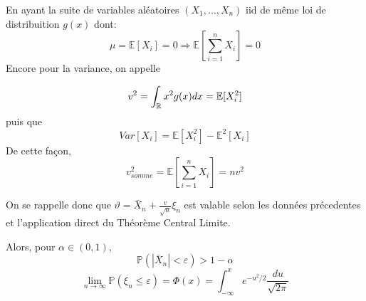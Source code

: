 \documentclass{article}
\newcommand{\mean}{\mathbb{E}}
\begin{document}
En ayant la suite de variables aléatoires $\displaystyle (X_1,...,X_n) $ iid de même loi de distribuition $\displaystyle g(x)$ dont:
$$\mu = \mean[X_i] = 0 \Rightarrow \mean[\sum_{i=1}^n X_i ] = 0 $$
Encore pour la variance, on appelle

$$\displaystyle v^2 = \int_{\cal \mathbb{R}} x^2g(x)dx = \mean[X_i^2]$$
puis que
$$\displaystyle Var[X_i] = \mean[X_i^2]-\mean^2[X_i] $$
De cette façon,
$$v_{somme}^2=\mean[\sum_{i=1}^n X_i ]= nv^2$$


On se rappelle donc que $\displaystyle\vartheta = \bar X_n + \frac{v}{\sqrt{n}}\xi_n$ est valable selon les données précedentes et l'application direct du Théorème Central Limite.

Alors, pour $\displaystyle \alpha\in(0,1)$,
$$\mathbb{P}(|\bar X_n |<\varepsilon)>1-\alpha$$
$$\lim_{n \to \infty}\mathbb{P}(\xi_n \leq \varepsilon)=\Phi(x) = \int_{-\infty}^xe^{-u^2/2}\frac{du}{\sqrt{2\pi}}$$
\end{document}
